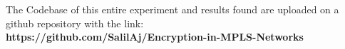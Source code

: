 The Codebase of this entire experiment and results found are uploaded on a github repository with the link:\\
 \textbf{https://github.com/SalilAj/Encryption-in-MPLS-Networks}